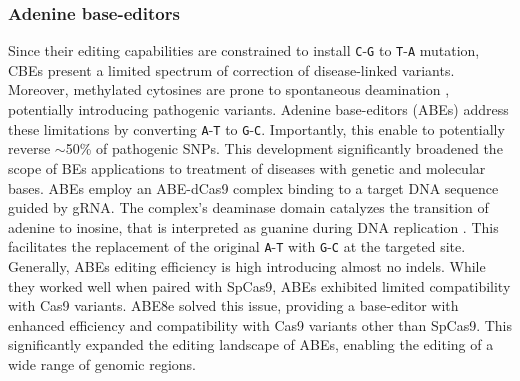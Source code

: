 \documentclass[a4paper, titlepage, openright]{book}
\begin{document}
\subsubsection{Adenine base-editors}
Since their editing capabilities are constrained to install \texttt{C}-\texttt{G} to \texttt{T}-\texttt{A} mutation, CBEs present a limited spectrum of correction of disease-linked variants. Moreover, methylated cytosines are prone to spontaneous deamination \citep{alsoe2017uracil}, potentially introducing pathogenic variants. Adenine base-editors (ABEs) address these limitations by converting \texttt{A}-\texttt{T} to \texttt{G}-\texttt{C}. Importantly, this enable to potentially reverse $\sim$50\% of pathogenic SNPs. This development significantly broadened the scope of BEs applications to treatment of diseases with genetic and molecular bases. ABEs employ an ABE-dCas9 complex binding to a target DNA sequence guided by gRNA. The complex's deaminase domain catalyzes the transition of adenine to inosine, that is interpreted as guanine during DNA replication \citep{gaudelli2017programmable}. This facilitates the replacement of the original \texttt{A}-\texttt{T} with \texttt{G}-\texttt{C} at the targeted site. Generally, ABEs editing efficiency is high introducing almost no indels. While they worked well when paired with SpCas9, ABEs exhibited limited compatibility with Cas9 variants. ABE8e \citep{gaudelli2017programmable, richter2020phage} solved this issue, providing a base-editor with enhanced efficiency and compatibility with Cas9 variants other than SpCas9. This significantly expanded the editing landscape of ABEs, enabling the editing of a wide range of genomic regions.

\end{document}
